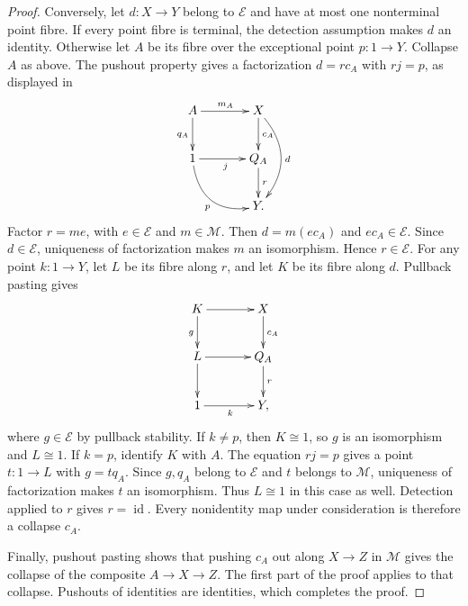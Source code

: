 \documentclass[11pt,a4paper]{article}
\theoremstyle{plain}
\theoremstyle{definition}
\theoremstyle{remark}
\newcommand{\id}{\operatorname{id}}
\begin{document}
\begin{proof}
Conversely, let $d:X\to Y$ belong to $\mathcal E$ and have
at most one nonterminal point fibre. If every point fibre is
terminal, the detection assumption makes $d$ an identity.
Otherwise let $A$ be its fibre over the exceptional point
$p:1\to Y$. Collapse $A$ as above. The pushout property gives
a factorization $d=r c_A$ with $rj=p$, as displayed in
\[
\xymatrix@C=3.5em@R=2.4em{
A\ar[r]^{m_A}\ar[d]_{q_A}&X\ar[d]^{c_A}
  \ar@/^1.5pc/[dd]^d\\
1\ar[r]_j\ar@/_1.5pc/[dr]_p&Q_A\ar[d]^r\\
&Y.
}
\]
Factor $r=me$, with $e\in\mathcal E$ and $m\in\mathcal M$.
Then $d=m(ec_A)$ and $ec_A\in\mathcal E$. Since
$d\in\mathcal E$, uniqueness of factorization makes $m$ an
isomorphism. Hence $r\in\mathcal E$.
For any point $k:1\to Y$, let $L$ be its
fibre along $r$, and let $K$ be its fibre along $d$. Pullback
pasting gives
\[
\xymatrix@C=3.5em@R=2.4em{
K\ar[r]\ar[d]_g&X\ar[d]^{c_A}\\
L\ar[r]\ar[d]&Q_A\ar[d]^r\\
1\ar[r]_k&Y,
}
\]
where $g\in\mathcal E$ by pullback stability. If $k\ne p$,
then $K\cong1$, so $g$ is an isomorphism and $L\cong1$.
If $k=p$, identify $K$ with $A$. The equation $rj=p$ gives
a point $t:1\to L$ with $g=tq_A$. Since $g,q_A$ belong to
$\mathcal E$ and $t$ belongs to $\mathcal M$, uniqueness of
factorization makes $t$ an isomorphism. Thus $L\cong1$ in
this case as well. Detection applied to $r$ gives $r=\id$.
Every nonidentity map under consideration is therefore a collapse
$c_A$.

Finally, pushout pasting shows that pushing $c_A$ out along
$X\to Z$ in $\mathcal M$ gives the collapse of the composite
$A\to X\to Z$. The first part of the proof applies to that
collapse. Pushouts of identities are identities, which completes
the proof.
\end{proof}
\end{document}
